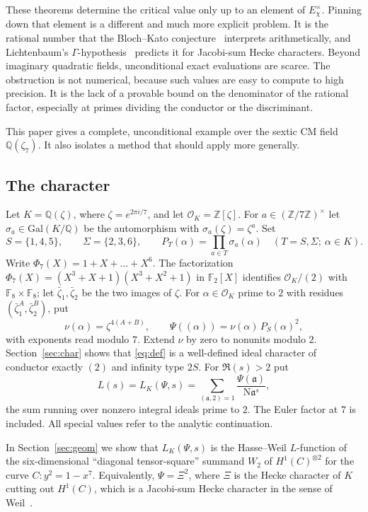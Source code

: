 \documentclass[11pt]{amsart}
\theoremstyle{remark}
\theoremstyle{definition}
\newcommand{\Q}{\mathbb{Q}}
\newcommand{\Z}{\mathbb{Z}}
\newcommand{\F}{\mathbb{F}}
\newcommand{\OK}{\mathcal{O}_K}
\newcommand{\Nm}{\mathrm{N}}
\begin{document}
These theorems determine the critical value only up to an element of $E_\chi^\times$. Pinning down that element is a different and much more explicit problem. It is the rational number that the Bloch--Kato conjecture~\cite{BlochKato} interprets arithmetically, and Lichtenbaum's $\Gamma$-hypothesis~\cite{Lichtenbaum} predicts it for Jacobi-sum Hecke characters. Beyond imaginary quadratic fields, unconditional exact evaluations are scarce. The obstruction is not numerical, because such values are easy to compute to high precision. It is the lack of a provable bound on the denominator of the rational factor, especially at primes dividing the conductor or the discriminant.

This paper gives a complete, unconditional example over the sextic CM field $\Q(\zeta_7)$. It also isolates a method that should apply more generally.

\subsection{The character}
Let $K=\Q(\zeta)$, where $\zeta=e^{2\pi i/7}$, and let $\OK=\Z[\zeta]$. For $a\in(\Z/7\Z)^\times$ let $\sigma_a\in\mathrm{Gal}(K/\Q)$ be the automorphism with $\sigma_a(\zeta)=\zeta^a$. Set
\[
S=\{1,4,5\},\qquad \Sigma=\{2,3,6\},\qquad P_T(\alpha)=\prod_{a\in T}\sigma_a(\alpha)\quad (T=S,\Sigma;\ \alpha\in K).
\]
Write $\Phi_7(X)=1+X+\dots+X^6$. The factorization $\Phi_7(X)=(X^3+X+1)(X^3+X^2+1)$ in $\F_2[X]$ identifies $\OK/(2)$ with $\F_8\times\F_8$; let $\bar\zeta_1,\bar\zeta_2$ be the two images of $\zeta$. For $\alpha\in\OK$ prime to $2$ with residues $(\bar\zeta_1^{A},\bar\zeta_2^{B})$, put
\begin{equation}\label{eq:def}
\nu(\alpha)=\zeta^{4(A+B)},\qquad \Psi((\alpha))=\nu(\alpha)\,P_S(\alpha)^2,
\end{equation}
with exponents read modulo $7$. Extend $\nu$ by zero to nonunits modulo $2$. Section~\ref{sec:char} shows that \eqref{eq:def} is a well-defined ideal character of conductor exactly $(2)$ and infinity type $2S$. For $\Re(s)>2$ put
\[
L(s)=L_K(\Psi,s)=\sum_{(\mathfrak a,2)=1}\frac{\Psi(\mathfrak a)}{\Nm\mathfrak a^{s}},
\]
the sum running over nonzero integral ideals prime to $2$. The Euler factor at $7$ is included. All special values refer to the analytic continuation.

In Section~\ref{sec:geom} we show that $L_K(\Psi,s)$ is the Hasse--Weil $L$-function of the six-dimensional ``diagonal tensor-square'' summand $W_2$ of $H^1(C)^{\otimes2}$ for the curve $C\colon y^2=1-x^7$. Equivalently, $\Psi=\Xi^2$, where $\Xi$ is the Hecke character of $K$ cutting out $H^1(C)$, which is a Jacobi-sum Hecke character in the sense of Weil~\cite{Weil}.
\end{document}
